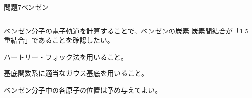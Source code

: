 \documentclass[dvipdfmx]{beamer}
\newenvironment{wideitemize}{\itemize\setlength{\itemsep}{1em}}{\enditemize}
\newenvironment{wideitemize2}{\itemize\setlength{\itemsep}{0.2em}}{\enditemize}
\begin{document}

\begin{frame}{問題7}{ベンゼン}
\begin{columns}[t]
\begin{column}{0.7\textwidth}
\begin{wideitemize}
	\item ベンゼン分子の電子軌道を計算することで、ベンゼンの炭素-炭素間結合が「1.5重結合」であることを確認したい。
	\begin{wideitemize2}
		\item ハートリー・フォック法を用いること。
		\item 基底関数系に適当なガウス基底を用いること。
		\item ベンゼン分子中の各原子の位置は予め与えてよい。
	\end{wideitemize2}
\end{wideitemize}


\end{column}
\end{columns}
\end{frame}
\end{document}

